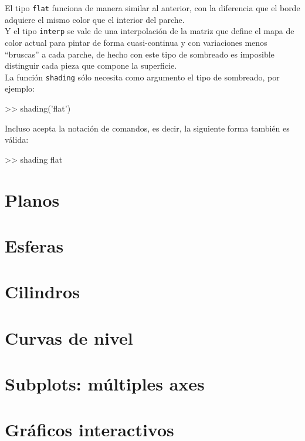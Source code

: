 El tipo \texttt{flat} funciona de manera similar al anterior, con la
diferencia que el borde adquiere el mismo color que el interior del
parche. \\

Y el tipo \texttt{interp} se vale de una interpolación de la matriz que
define el mapa de color actual para pintar de forma cuasi-continua y con
variaciones menos ``bruscas'' a cada parche, de hecho con este tipo de
sombreado es imposible distinguir cada pieza que compone la superficie. \\

La función \texttt{shading} sólo necesita como argumento el tipo de
sombreado, por ejemplo:

\begin{matlab}
>> shading('flat')
\end{matlab}

Incluso acepta la notación de comandos, es decir, la siguiente forma
también es válida:

\begin{matlab}
>> shading flat
\end{matlab}

\section{Planos}

\section{Esferas}

\section{Cilindros}

\section{Curvas de nivel}

\section{Subplots: múltiples axes}

\section{Gráficos interactivos}